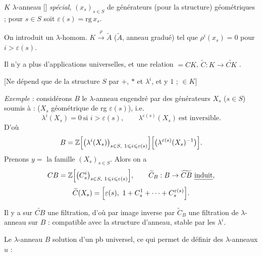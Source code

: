 \documentclass[11pt,a4paper]{article}
\begin{document}
$K$ $\lambda$-anneau \struck{\ill{}} [\struck{\ill{}}] \emph{spécial},
$(x_{s})_{s \in S}$   de générateurs (pour la
structure) géométriques ; pour $s \in S$ soit $\varepsilon(s) = \mathrm{rg}\, x_{s}$.

On introduit un $\lambda$-homom. $K \xrightarrow{\ \rho\ } \widetilde{A}$
($\widetilde{A}$, anneau \ill{} gradué) tel que $\rho^{i}(x_{s}) = 0$ pour
$i > \varepsilon(s)$.

Il n'y a  plus d'applications universelles, et une relation
\struck{\ill{}} $= CK$, $\widetilde{C} : K \to \widetilde{CK}$
.

[Ne dépend que de la structure $S$ par $+$, $*$ et $\lambda^{i}$, et y
 $1$ ; \ill{} $\in K$]

\emph{Exemple} : considérons \struck{\ill{}} $B$ le $\lambda$-anneau
 engendré par des générateurs $X_{s}$ ($s \in S$) soumis à :
\struck{\ill{}} ($X_{s}$ géométrique de rg $\varepsilon(s)$), i.e.
\[
  \lambda^{i}(X_{s}) = 0 \ \text{si } i > \varepsilon(s),
  \qquad \lambda^{\varepsilon(s)}(X_{s}) \ \text{est inversible} .
\]
D'où
\[
  B = \mathbb{Z}\Bigl[\bigl(\lambda^{i}(X_{s})\bigr)_{s \in S,\ 1 \leqslant i \leqslant \varepsilon(s)}\Bigr]
      \Bigl[\bigl(\lambda^{\varepsilon(s)}(X_{s})^{-1}\bigr)\Bigr] .
\]
Prenons $y = $ la famille $(X_{s})_{s \in S}$. Alors on a
\[
  CB = \mathbb{Z}\Bigl[\bigl(C^{i}_{s}\bigr)_{s \in S,\ 1 \leqslant i \leqslant \varepsilon(s)}\Bigr],
  \qquad
  \widetilde{C}_{B} : B \to \widetilde{CB} \ \text{\uncertain{induit}},
\]
\[
  \widetilde{C}(X_{s}) = \Bigl[\varepsilon(s),\ 1 + C^{1}_{s} + \cdots + C^{\varepsilon(s)}_{s}\Bigr] .
\]

Il y a sur $\widetilde{CB}$ une filtration, d'où par image inverse par
$\widetilde{C}_{B}$ une filtration de $\lambda$-anneau sur $B$ : compatible
avec la structure d'anneau, stable par les $\lambda^{i}$.

Le $\lambda$-anneau $B$   solution d'un pb
universel, ce qui permet de définir \ill{} \ill{} des $\lambda$-anneaux
$u$ :

\end{document}
